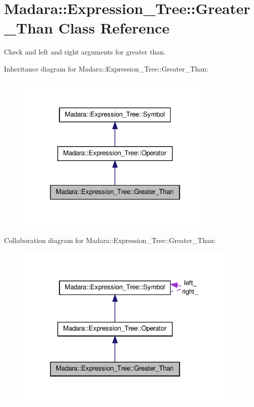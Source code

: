 \hypertarget{classMadara_1_1Expression__Tree_1_1Greater__Than}{
\section{Madara::Expression\_\-Tree::Greater\_\-Than Class Reference}
\label{d5/dcd/classMadara_1_1Expression__Tree_1_1Greater__Than}
}


Check and left and right arguments for greater than.  




Inheritance diagram for Madara::Expression\_\-Tree::Greater\_\-Than:
\nopagebreak
\begin{figure}[H]
\begin{center}
\leavevmode
\includegraphics[width=274pt]{d0/d66/classMadara_1_1Expression__Tree_1_1Greater__Than__inherit__graph}
\end{center}
\end{figure}


Collaboration diagram for Madara::Expression\_\-Tree::Greater\_\-Than:
\nopagebreak
\begin{figure}[H]
\begin{center}
\leavevmode
\includegraphics[width=303pt]{db/d6e/classMadara_1_1Expression__Tree_1_1Greater__Than__coll__graph}
\end{center}
\end{figure}

